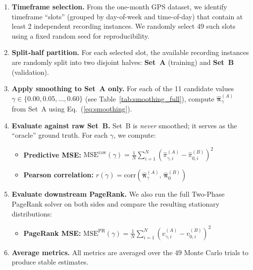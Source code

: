 \documentclass[12pt,a4paper]{article}
\theoremstyle{definition}
\theoremstyle{plain}
\begin{document}
\begin{enumerate}[label=\textbf{Step~\arabic*.}]
  \item \textbf{Timeframe selection.} From the one-month GPS dataset, we identify
    timeframe ``slots'' (grouped by day-of-week and time-of-day) that contain at
    least 2 independent recording instances. We randomly select 49 such slots using
    a fixed random seed for reproducibility.

  \item \textbf{Split-half partition.} For each selected slot, the available recording
    instances are randomly split into two disjoint halves: \textbf{Set~A} (training)
    and \textbf{Set~B} (validation).

  \item \textbf{Apply smoothing to Set~A only.} For each of the 11 candidate
    values $\gamma \in \{0.00, 0.05, \ldots, 0.60\}$ (see
    Table~\ref{tab:smoothing_full}), compute
    $\hat{\boldsymbol{\pi}}_\gamma^{(A)}$ from Set~A using
    Eq.~(\ref{eq:smoothing}).

  \item \textbf{Evaluate against raw Set~B.} Set~B is \emph{never} smoothed; it serves
    as the ``oracle'' ground truth. For each $\gamma$, we compute:
    \begin{itemize}
      \item \textbf{Predictive MSE:}
        $\text{MSE}^{\text{raw}}(\gamma) = \frac{1}{N}\sum_{i=1}^N
        (\hat{\pi}_{\gamma,i}^{(A)} - \hat{\pi}_{0,i}^{(B)})^2$
      \item \textbf{Pearson correlation:}
        $r(\gamma) = \text{corr}(\hat{\boldsymbol{\pi}}_\gamma^{(A)},\,
        \hat{\boldsymbol{\pi}}_0^{(B)})$
    \end{itemize}

  \item \textbf{Evaluate downstream PageRank.} We also run the full Two-Phase PageRank
    solver on both sides and compare the resulting stationary distributions:
    \begin{itemize}
      \item \textbf{PageRank MSE:}
        $\text{MSE}^{\text{PR}}(\gamma)
        = \frac{1}{N}\sum_{i=1}^N(v_{\gamma,i}^{(A)} - v_{0,i}^{(B)})^2$
    \end{itemize}

  \item \textbf{Average metrics.} All metrics are averaged over the 49 Monte Carlo
    trials to produce stable estimates.
\end{enumerate}
\end{document}
